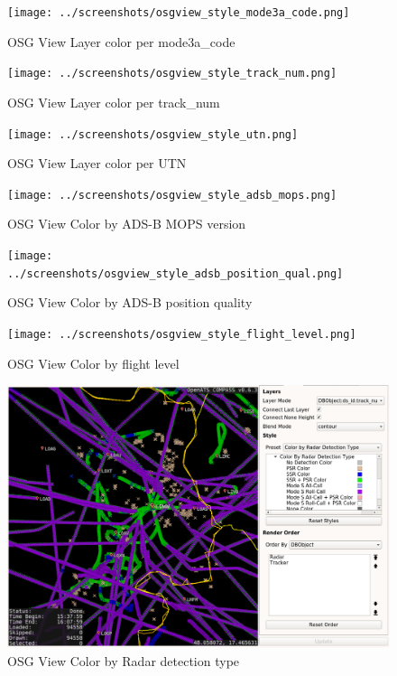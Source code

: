 \begin{figure}[H]
    \hspace*{-2.5cm}
    \texttt{[image: ../screenshots/osgview\_style\_mode3a\_code.png]}
  \caption{OSG View Layer color per mode3a\_code}
\end{figure}

\begin{figure}[H]
    \hspace*{-2.5cm}
    \texttt{[image: ../screenshots/osgview\_style\_track\_num.png]}
  \caption{OSG View Layer color per track\_num}
\end{figure}

\begin{figure}[H]
    \hspace*{-2.5cm}
    \texttt{[image: ../screenshots/osgview\_style\_utn.png]}
  \caption{OSG View Layer color per UTN}
\end{figure}

\begin{figure}[H]
    \hspace*{-2.5cm}
    \texttt{[image: ../screenshots/osgview\_style\_adsb\_mops.png]}
  \caption{OSG View Color by ADS-B MOPS version}
\end{figure}

\begin{figure}[H]
    \hspace*{-2.5cm}
    \texttt{[image: ../screenshots/osgview\_style\_adsb\_position\_qual.png]}
  \caption{OSG View Color by ADS-B position quality}
\end{figure}

\begin{figure}[H]
    \hspace*{-2.5cm}
    \texttt{[image: ../screenshots/osgview\_style\_flight\_level.png]}
  \caption{OSG View Color by flight level}
\end{figure}

\begin{figure}[H]
    \hspace*{-2.5cm}
    \includegraphics[width=19cm,frame]{../screenshots/osgview_style_radar_detection_type.png}
  \caption{OSG View Color by Radar detection type}
\end{figure}

